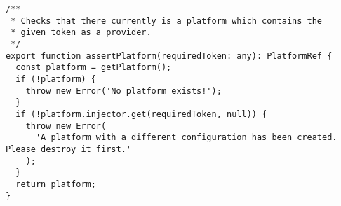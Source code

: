 \begin{verbatim}
/**
 * Checks that there currently is a platform which contains the
 * given token as a provider.
 */
export function assertPlatform(requiredToken: any): PlatformRef {
  const platform = getPlatform();
  if (!platform) {
    throw new Error('No platform exists!');
  }
  if (!platform.injector.get(requiredToken, null)) {
    throw new Error(
      'A platform with a different configuration has been created. Please destroy it first.'
    );
  }
  return platform;
}
\end{verbatim}
